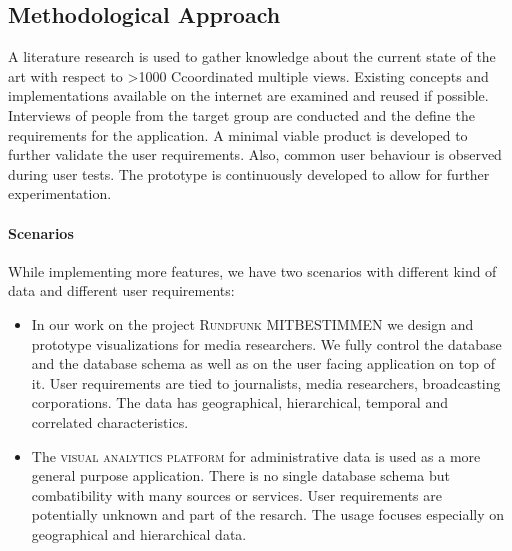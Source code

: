 \documentclass{article}
\newcommand{\rufu}{\textsc{Rundfunk MITBESTIMMEN}}
\newcommand{\visan}{\textsc{visual analytics platform}}
\newcommand\hmm[1]{\ifnum\ifhmode\spacefactor\else2000\fi>1000 \uppercase{#1}\else#1\fi}
\newcommand{\cmvs}{\hmm{c}oordinated multiple views}
\begin{document}


\subsection{Methodological Approach}

A literature research is used to gather knowledge about the current state of the art with respect to \cmvs{}.
Existing concepts and implementations available on the internet are examined and reused if possible.
Interviews of people from the target group are conducted and the define the requirements for the application.
A minimal viable product is developed to further validate the user requirements.
Also, common user behaviour is observed during user tests.
The prototype is continuously developed to allow for further experimentation.

\paragraph{Scenarios}
While implementing more features, we have two scenarios with different kind of data and different user requirements:
\begin{itemize}
  \item
    In our work on the project \rufu{} we design and prototype visualizations for media researchers.
    We fully control the database and the database schema as well as on the user facing application on top of it.
    User requirements are tied to journalists, media researchers, broadcasting corporations.
    The data has geographical, hierarchical, temporal and correlated characteristics.
  \item
    The \visan{} for administrative data is used as a more general purpose application.
    There is no single database schema but combatibility with many sources or services.
    User requirements are potentially unknown and part of the resarch.
    The usage focuses especially on geographical and hierarchical data.
\end{itemize}
\end{document}
